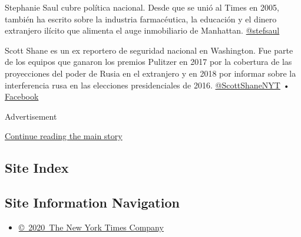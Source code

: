 Stephanie Saul cubre política nacional. Desde que se unió al Times en
2005, también ha escrito sobre la industria farmacéutica, la educación y
el dinero extranjero ilícito que alimenta el auge inmobiliario de
Manhattan. \href{https://twitter.com/stefsaul}{@stefsaul}

Scott Shane es un ex reportero de seguridad nacional en Washington. Fue
parte de los equipos que ganaron los premios Pulitzer en 2017 por la
cobertura de las proyecciones del poder de Rusia en el extranjero y en
2018 por informar sobre la interferencia rusa en las elecciones
presidenciales de 2016.
\href{https://twitter.com/ScottShaneNYT}{@ScottShaneNYT} •
\href{https://www.facebookcorewwwi.onion/scott.shane.37}{Facebook}

Advertisement

\protect\hyperlink{after-bottom}{Continue reading the main story}

\hypertarget{site-index}{%
\subsection{Site Index}\label{site-index}}

\hypertarget{site-information-navigation}{%
\subsection{Site Information
Navigation}\label{site-information-navigation}}

\begin{itemize}
\tightlist
\item
  \href{https://help.nytimes3xbfgragh.onion/hc/en-us/articles/115014792127-Copyright-notice}{©~2020~The
  New York Times Company}
\end{itemize}

